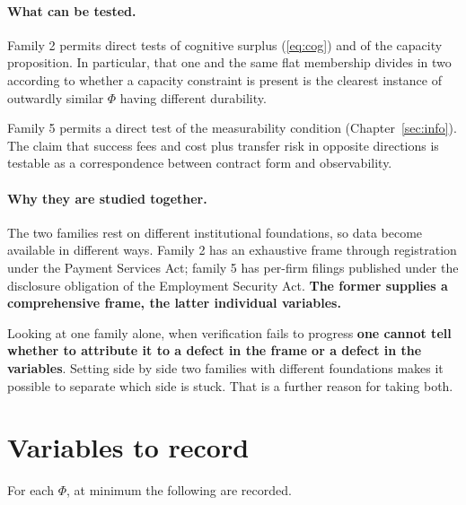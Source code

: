 \paragraph{What can be tested.}

Family 2 permits direct tests of cognitive surplus (\eqref{eq:cog}) and of the capacity
proposition. In particular, that one and the same flat membership divides in two according to
whether a capacity constraint is present is the clearest instance of outwardly similar $\Phi$
having different durability.

Family 5 permits a direct test of the measurability condition (Chapter~\ref{sec:info}). The
claim that success fees and cost plus transfer risk in opposite directions is testable as a
correspondence between contract form and observability.

\paragraph{Why they are studied together.}

The two families rest on different institutional foundations, so data become available in
different ways. Family 2 has an exhaustive frame through registration under the Payment
Services Act; family 5 has per-firm filings published under the disclosure obligation of the
Employment Security Act.
\textbf{The former supplies a comprehensive frame, the latter individual variables.}

Looking at one family alone, when verification fails to progress
\textbf{one cannot tell whether to attribute it to a defect in the frame or a defect in the
variables}. Setting side by side two families with different foundations makes it possible to
separate which side is stuck. That is a further reason for taking both.

\section{Variables to record}

For each $\Phi$, at minimum the following are recorded.

